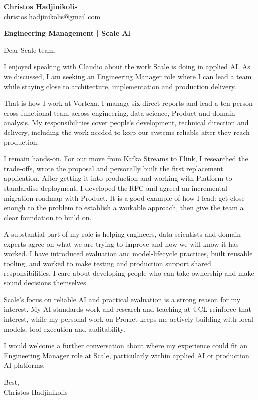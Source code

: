 \documentclass[11pt,a4paper]{article}
\begin{document}
{\Large\bfseries Christos Hadjinikolis}\\[3pt]
{\small\href{mailto:christos.hadjinikolis@gmail.com}{christos.hadjinikolis@gmail.com}}

\vspace{8pt}
\textbf{Engineering Management | Scale AI}

\vspace{3pt}
Dear Scale team,

I enjoyed speaking with Claudio about the work Scale is doing in applied AI. As we discussed, I am seeking an Engineering Manager role where I can lead a team while staying close to architecture, implementation and production delivery.

That is how I work at Vortexa. I manage six direct reports and lead a ten-person cross-functional team across engineering, data science, Product and domain analysis. My responsibilities cover people's development, technical direction and delivery, including the work needed to keep our systems reliable after they reach production.

I remain hands-on. For our move from Kafka Streams to Flink, I researched the trade-offs, wrote the proposal and personally built the first replacement application. After getting it into production and working with Platform to standardise deployment, I developed the RFC and agreed an incremental migration roadmap with Product. It is a good example of how I lead: get close enough to the problem to establish a workable approach, then give the team a clear foundation to build on.

A substantial part of my role is helping engineers, data scientists and domain experts agree on what we are trying to improve and how we will know it has worked. I have introduced evaluation and model-lifecycle practices, built reusable tooling, and worked to make testing and production support shared responsibilities. I care about developing people who can take ownership and make sound decisions themselves.

Scale's focus on reliable AI and practical evaluation is a strong reason for my interest. My AI standards work and research and teaching at UCL reinforce that interest, while my personal work on Promet keeps me actively building with local models, tool execution and auditability.

I would welcome a further conversation about where my experience could fit an Engineering Manager role at Scale, particularly within applied AI or production AI platforms.

Best,\\
Christos Hadjinikolis
\end{document}
